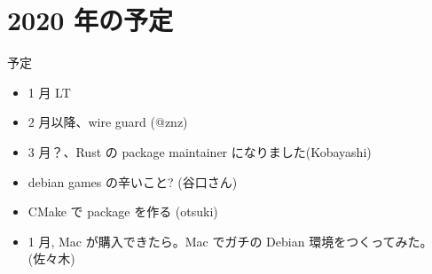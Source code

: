 \documentclass[cjk,dvipdfmx,10pt,compress,%
hyperref={bookmarks=true,bookmarksnumbered=true,bookmarksopen=false,%
colorlinks=false,%
pdftitle={第 153 回 関西 Debian 勉強会},%
pdfauthor={おおつき},%
pdfsubject={資料},%
}]{beamer}
\begin{document}
\section{2020 年の予定}
\begin{frame}[fragile]
  \begin{block}{予定}
    \begin{itemize}
        \item 1 月 LT
	\item 2 月以降、wire guard (@znz)  
        \item 3 月？、Rust の package maintainer になりました(Kobayashi)
	\item debian games の辛いこと?  (谷口さん)
	\item CMake で package を作る (otsuki)
	\item 1 月, Mac が購入できたら。Mac でガチの Debian 環境をつくってみた。(佐々木)	
    \end{itemize}
  \end{block}
\end{frame}


\takahashi[50]{}
\end{document}
